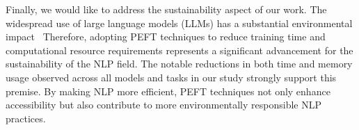 \documentclass[fleqn,moreauthors,10pt]{ds_report}
\begin{document}
Finally, we would like to address the sustainability aspect of our work. The widespread use of large language models (LLMs) has a substantial environmental impact~\cite{carbon_footprint} Therefore, adopting PEFT techniques to reduce training time and computational resource requirements represents a significant advancement for the sustainability of the NLP field. The notable reductions in both time and memory usage observed across all models and tasks in our study strongly support this premise. By making NLP more efficient, PEFT techniques not only enhance accessibility but also contribute to more environmentally responsible NLP practices.



\end{document}
